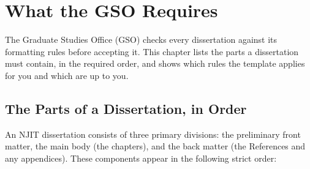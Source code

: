 %

\chapter{What the GSO Requires}
\label{ch:requirements}

The Graduate Studies Office (GSO) checks every dissertation against its formatting rules before accepting it. This chapter lists the parts a dissertation must contain, in the required order, and shows which rules the template applies for you and which are up to you.

\section{The Parts of a Dissertation, in Order}

An NJIT dissertation consists of three primary divisions: the preliminary front matter, the main body (the chapters), and the back matter (the References and any appendices). These components appear in the following strict order:

